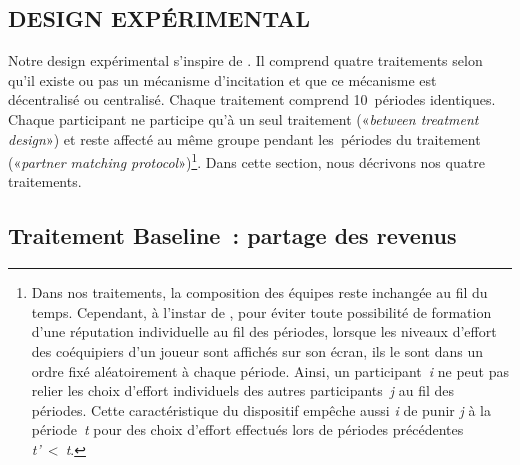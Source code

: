 \begin{Article}
\begin{refsection}[Lebourges]
\section{DESIGN EXPÉRIMENTAL}
\label{section:design expérimental}

Notre design expérimental s'inspire de \textcite{NalbantianSchotter1997}. Il comprend quatre traitements selon qu'il existe ou pas un
mécanisme d'incitation et que ce mécanisme est décentralisé ou
centralisé. Chaque traitement comprend 10~périodes identiques. Chaque
participant ne participe qu'à un seul traitement («\emph{between
treatment design}») et reste affecté au même groupe pendant les~périodes du traitement («\emph{partner matching
protocol}»)\footnote{Dans nos traitements, la composition des équipes
  reste inchangée au fil du temps. Cependant, à l'instar de \textcite{FehrGächter2000}, pour éviter toute possibilité de formation d'une
  réputation individuelle au fil des périodes, lorsque les niveaux
  d'effort des coéquipiers d'un joueur sont affichés sur son écran, ils
  le sont dans un ordre fixé aléatoirement à chaque période. Ainsi, un
  participant~\emph{i} ne peut pas relier les choix d'effort individuels
  des autres participants~\emph{j} au fil des périodes. Cette
  caractéristique du dispositif empêche aussi \emph{i} de punir \emph{j}
  à la période~\emph{t} pour des choix d'effort effectués lors de
  périodes précédentes \emph{t'}~\textless~\emph{t}.}.
Dans cette section, nous décrivons nos quatre traitements.

\subsection{Traitement Baseline~: partage des revenus}


\end{refsection}
\end{Article}
